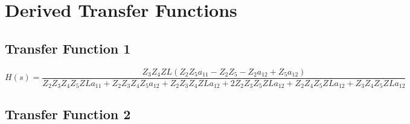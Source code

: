 \documentclass{article}
\begin{document}
    \section*{Derived Transfer Functions}
    \subsection*{Transfer Function 1}
\[ H(s) = \frac{Z_{3} Z_{4} ZL \left(Z_{2} Z_{5} a_{11} - Z_{2} Z_{5} - Z_{2} a_{12} + Z_{5} a_{12}\right)}{Z_{2} Z_{3} Z_{4} Z_{5} ZL a_{11} + Z_{2} Z_{3} Z_{4} Z_{5} a_{12} + Z_{2} Z_{3} Z_{4} ZL a_{12} + 2 Z_{2} Z_{3} Z_{5} ZL a_{12} + Z_{2} Z_{4} Z_{5} ZL a_{12} + Z_{3} Z_{4} Z_{5} ZL a_{12}} \]
\subsection*{Transfer Function 2}
\end{document}
